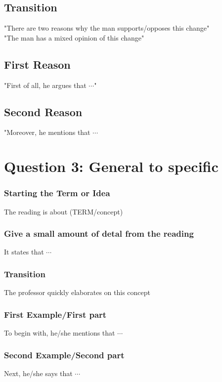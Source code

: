 \documentclass[11pt]{article}
\begin{document}
\subsection*{Transition}
"There are two reasons why the man supports/opposes this change"\\

"The man has a mixed opinion of this change"\\

\subsection*{First Reason}
"First of all, he argues that $\cdots$"\\

\subsection*{Second Reason}

"Moreover, he mentions that $\cdots$\\

\section{Question 3: General to specific}
\subsubsection*{Starting the Term or Idea}
The reading is about (TERM/concept)

\subsubsection*{Give a small amount of detal from the reading}
It states that $\cdots$

\subsubsection*{Transition}
The professor quickly elaborates on this concept

\subsubsection*{First Example/First part}
To begin with, he/she mentions that $\cdots$

\subsubsection*{Second Example/Second part}
Next, he/she says that $\cdots$
\end{document}
